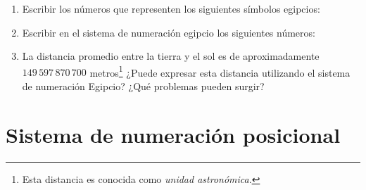 \documentclass[12pt]{article}
\begin{document}
\begin{enumerate}[resume]

    \item Escribir los números que representen los siguientes símbolos
        egipcios:


    \item Escribir en el sistema de numeración egipcio los siguientes números:


    \item La distancia promedio entre la tierra y el sol es de aproximadamente
        $149\,597\,870\,700$ metros\footnote{Esta distancia es conocida como
        \emph{unidad astronómica}.} ¿Puede expresar esta distancia utilizando
        el sistema de numeración Egipcio? ¿Qué problemas pueden surgir?

\end{enumerate}

\section{Sistema de numeración posicional}
\end{document}
